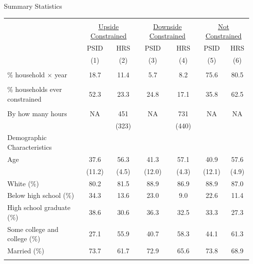 \begin{center}
\footnotesize
\begin{threeparttable}
\caption{Summary Statistics} \label{Summary}
\begin{tabular}{lcccccc}
\hline \hline \\[-1ex]
                            &\multicolumn{2}{c}{\underline{Upside Constrained}}
                            &\multicolumn{2}{c}{\underline{Downside Constrained}}
                            &\multicolumn{2}{c}{\underline{Not Constrained}}                      \\[.5em]
                                            &PSID   &HRS      &PSID   &HRS      &PSID   &HRS      \\
                                            & (1)   & (2)     &(3)    & (4)     & (5)   &(6)      \\
\hline \\
\% household $\times$ year                  &18.7   &11.4     &5.7    &8.2      &75.6   &80.5     \\ \\
\% households ever constrained              &52.3   &23.3     &24.8   &17.1     &35.8   &62.5     \\ \\
By how many hours                           &NA     &451      &NA     &731      &NA     &NA       \\
                                            &       &(323)    &       &(440)    &       &         \\
Demographic Characteristics &&&&&& \\
\hspace{.3in} Age                           &37.6   &56.3     &41.3   &57.1     &40.9   &57.6     \\
                                            &(11.2) &(4.5)    &(12.0) &(4.3)    &(12.1) &(4.9)    \\[1ex]
\hspace{.3in} White (\%)                    &80.2   &81.5     &88.9   &86.9     &88.9   &87.0     \\[1ex]
\hspace{.3in} Below high school (\%)        &34.3   &13.6     &23.0   &9.0      &22.6   &11.4     \\[1ex]
\hspace{.3in} High school graduate (\%)     &38.6   &30.6     &36.3   &32.5     &33.3   &27.3     \\[1ex]
\hspace{.3in} Some college and college (\%) &27.1   &55.9     &40.7   &58.3     &44.1   &61.3     \\[1ex]
\hspace{.3in} Married (\%)                  &73.7   &61.7     &72.9   &65.6     &73.8   &68.9     \\ \\


\end{tabular}
\end{threeparttable}
\end{center}
